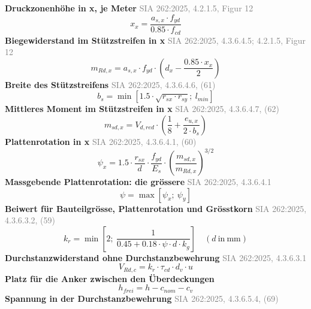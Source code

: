 \documentclass[11pt,a4paper]{article}
\newcommand{\normref}[1]{{\small\textcolor{gray}{#1}}}
\begin{document}
\noindent\textbf{Druckzonenhöhe in x, je Meter} \hfill \normref{SIA 262:2025, 4.2.1.5, Figur 12}
\begin{equation*}
x_x = \frac{a_{s,x} \cdot f_{yd}}{0.85 \cdot f_{cd}}
\end{equation*}
\noindent\textbf{Biegewiderstand im Stützstreifen in x} \hfill \normref{SIA 262:2025, 4.3.6.4.5; 4.2.1.5, Figur 12}
\begin{equation*}
m_{Rd,x} = a_{s,x} \cdot f_{yd} \cdot \left(d_x - \frac{0.85 \cdot x_x}{2}\right)
\end{equation*}
\noindent\textbf{Breite des Stützstreifens} \hfill \normref{SIA 262:2025, 4.3.6.4.6, (61)}
\begin{equation*}
b_s = \min\left[1.5 \cdot \sqrt{r_{sx} \cdot r_{sy}};\ l_{min}\right]
\end{equation*}
\noindent\textbf{Mittleres Moment im Stützstreifen in x} \hfill \normref{SIA 262:2025, 4.3.6.4.7, (62)}
\begin{equation*}
m_{sd,x} = V_{d,red} \cdot \left(\frac{1}{8} + \frac{e_{u,x}}{2 \cdot b_s}\right)
\end{equation*}
\noindent\textbf{Plattenrotation in x} \hfill \normref{SIA 262:2025, 4.3.6.4.1, (60)}
\begin{equation*}
\psi_x = 1.5 \cdot \frac{r_{sx}}{d} \cdot \frac{f_{yd}}{E_s} \cdot \left(\frac{m_{sd,x}}{m_{Rd,x}}\right)^{3/2}
\end{equation*}
\noindent\textbf{Massgebende Plattenrotation: die grössere} \hfill \normref{SIA 262:2025, 4.3.6.4.1}
\begin{equation*}
\psi = \max\left[\psi_x;\ \psi_y\right]
\end{equation*}
\noindent\textbf{Beiwert für Bauteilgrösse, Plattenrotation und Grösstkorn} \hfill \normref{SIA 262:2025, 4.3.6.3.2, (59)}
\begin{equation*}
k_r = \min\left[2;\ \frac{1}{0.45 + 0.18 \cdot \psi \cdot d \cdot k_g}\right] \quad \left(d\ \text{in}\ \mathrm{mm}\right)
\end{equation*}
\noindent\textbf{Durchstanzwiderstand ohne Durchstanzbewehrung} \hfill \normref{SIA 262:2025, 4.3.6.3.1}
\begin{equation*}
V_{Rd,c} = k_r \cdot \tau_{cd} \cdot d_v \cdot u
\end{equation*}
\noindent\textbf{Platz für die Anker zwischen den Überdeckungen}
\begin{equation*}
h_{frei} = h - c_{nom} - c_v
\end{equation*}
\noindent\textbf{Spannung in der Durchstanzbewehrung} \hfill \normref{SIA 262:2025, 4.3.6.5.4, (69)}
\end{document}
